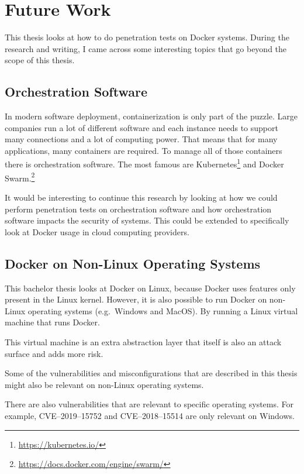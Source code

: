 \chapter{Future Work}\label{chapter:futurework}
This thesis looks at how to do penetration tests on Docker systems. During the research and writing, I came across some interesting topics that go beyond the scope of this thesis.

\section{Orchestration Software}
In modern software deployment, containerization is only part of the puzzle. Large companies run a lot of different software and each instance needs to support many connections and a lot of computing power. That means that for many applications, many containers are required. To manage all of those containers there is orchestration software. The most famous are Kubernetes\footnote{\url{https://kubernetes.io/}} and Docker Swarm.\footnote{\url{https://docs.docker.com/engine/swarm/}}

It would be interesting to continue this research by looking at how we could perform penetration tests on orchestration software and how orchestration software impacts the security of systems. This could be extended to specifically look at Docker usage in cloud computing providers.

\section{Docker on Non-Linux Operating Systems}
This bachelor thesis looks at Docker on Linux, because Docker uses features only present in the Linux kernel. However, it is also possible to run Docker on non-Linux operating systems (e.g.\ Windows and MacOS). By running a Linux virtual machine that runs Docker.

This virtual machine is an extra abstraction layer that itself is also an attack surface and adds more risk.

\medskip

Some of the vulnerabilities and misconfigurations that are described in this thesis might also be relevant on non-Linux operating systems.

There are also vulnerabilities that are relevant to specific operating systems. For example, CVE--2019--15752 and CVE--2018--15514 are only relevant on Windows.

\medskip

